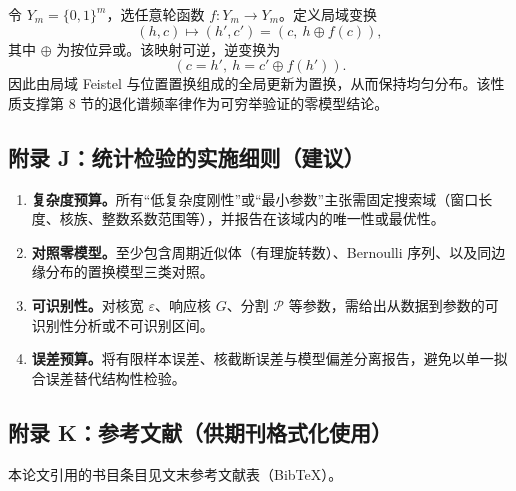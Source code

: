 令 $Y_m=\{0,1\}^m$，选任意轮函数 $f:Y_m\to Y_m$。定义局域变换
\[
(h,c)\mapsto(h',c')=(c,\ h\oplus f(c)),
\]
其中 $\oplus$ 为按位异或。该映射可逆，逆变换为
\[
(c=h',\ h=c'\oplus f(h')).
\]
因此由局域 Feistel 与位置置换组成的全局更新为置换，从而保持均匀分布。该性质支撑第 8 节的退化谱频率律作为可穷举验证的零模型结论。

\subsection{附录 J：统计检验的实施细则（建议）}
\label{app:tests}

\begin{enumerate}
  \item \textbf{复杂度预算。}所有“低复杂度刚性”或“最小参数”主张需固定搜索域（窗口长度、核族、整数系数范围等），并报告在该域内的唯一性或最优性。
  \item \textbf{对照零模型。}至少包含周期近似体（有理旋转数）、Bernoulli 序列、以及同边缘分布的置换模型三类对照。
  \item \textbf{可识别性。}对核宽 $\varepsilon$、响应核 $G$、分割 $\mathcal{P}$ 等参数，需给出从数据到参数的可识别性分析或不可识别区间。
  \item \textbf{误差预算。}将有限样本误差、核截断误差与模型偏差分离报告，避免以单一拟合误差替代结构性检验。
\end{enumerate}

\subsection{附录 K：参考文献（供期刊格式化使用）}
\label{app:refs}

本论文引用的书目条目见文末参考文献表（Bib\TeX{}）。

